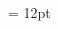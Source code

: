 \documentclass[gps1,twoside]{article}
\begin{document}
\begin{spacing}{0.916666666666667}
\begin{center}
\begin{center}
\section*{}\end{center}
\end{center}\end{spacing}\setlength{\columnsep}{12pt} 
\setlength\columnseprule{0.4pt} 
\begin{multicols}{2}\begin{spacing}{0.458333333333333}{\raggedright} \begin{spacing}{0.458333333333333}
\hangindent= 12pt
 \headwordafterentryletDatadicBody{}\spanenpronunciationggofonipaxemicspanentryletDatadicBody{[}\spanenpronunciationggofonipaxemicspanentryletDatadicBody{]}  \grammaticalinfoaftersensespanentryletDatadicBody{} \end{spacing}
 \end{spacing}\end{multicols}
\end{document}

